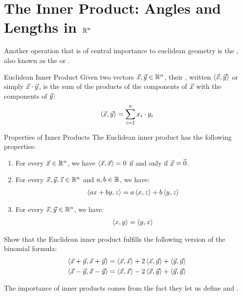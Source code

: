 \clearpage

\section{The Inner Product: Angles and Lengths in $\mathbb{R}^n$}
Another operation that is of central importance to euclidean geometry is the , also known as the  or .
\begin{importantdefinition}{Euclidean Inner Product}{}
	Given two vectors $\vec{x}, \vec{y} \in \mathbb{R}^n$, their , written $\left\langle \vec{x}, \vec{y} \right\rangle$ or simply $\vec{x} \cdot \vec{y}$, is the sum of the products of the components of $\vec{x}$ with the components of $\vec{y}$:
	\begin{align*}
		\left\langle \vec{x}, \vec{y} \right\rangle = \sum_{i = 1}^n x_i \cdot y_i
	\end{align*}
\end{importantdefinition}
\begin{importanttheorem}{Properties of Inner Products}{}
	The Euclidean inner product has the following properties:
	\begin{enumerate}
		\item {} For every $\vec{x} \in \mathbb{R}^n$, we have $\left\langle \vec{x}, \vec{x} \right\rangle = 0$ if and only if $\vec{x} = \kern-1.2pt\vec{\kern1.2pt 0}$.
		\item {} For every $\vec{x}, \vec{y}, \vec{z} \in \mathbb{R}^n$ and $a,b \in \mathbb{R}$, we have:
		\begin{align*}
			\left\langle ax + by, z \right\rangle = a \left\langle x, z \right\rangle + b \left\langle y, z \right\rangle
		\end{align*}
		\item {} For every $\vec{x}, \vec{y} \in \mathbb{R}^n$, we have:
		\begin{align*}
			\left\langle x, y \right\rangle = \left\langle y, x \right\rangle
		\end{align*}
	\end{enumerate}
\end{importanttheorem}
\begin{exercise}
	Show that the Euclidean inner product fulfills the following version of the binomial formula:
	\begin{align*}
		\left\langle \vec{x} + \vec{y}, \vec{x} + \vec{y} \right\rangle = \left\langle \vec{x}, \vec{x} \right\rangle + 2 \left\langle \vec{x}, \vec{y} \right\rangle + \left\langle \vec{y}, \vec{y} \right\rangle\\
		\left\langle \vec{x} - \vec{y}, \vec{x} - \vec{y} \right\rangle = \left\langle \vec{x}, \vec{x} \right\rangle - 2 \left\langle \vec{x}, \vec{y} \right\rangle + \left\langle \vec{y}, \vec{y} \right\rangle
	\end{align*}
\end{exercise}
The importance of inner products comes from the fact they let us define  and .
